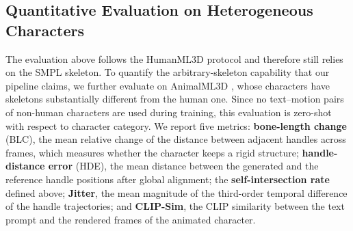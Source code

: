 \documentclass[lettersize,journal]{IEEEtran}
\newcommand{\blu}[1]{\texorpdfstring{{\leavevmode\color{blue}#1}}{#1}}
\begin{document}
\subsection{\blu{Quantitative Evaluation on Heterogeneous Characters}}
\blu{The evaluation above follows the HumanML3D protocol and therefore still relies on the SMPL
skeleton. To quantify the arbitrary-skeleton capability that our pipeline claims, we further
evaluate on AnimalML3D \cite{yang2024omnimotiongpt}, whose characters have skeletons substantially
different from the human one. Since no text--motion pairs of non-human characters are used
during training, this evaluation is zero-shot with respect to character category. We report
five metrics: \textbf{bone-length change} (BLC), the mean relative change of the distance
between adjacent handles across frames, which measures whether the character keeps a rigid
structure; \textbf{handle-distance error} (HDE), the mean distance between the generated and
the reference handle positions after global alignment; the \textbf{self-intersection rate}
defined above; \textbf{Jitter}, the mean magnitude of the third-order temporal difference of
the handle trajectories; and \textbf{CLIP-Sim}, the CLIP similarity between the text prompt
and the rendered frames of the animated character.}
\end{document}
